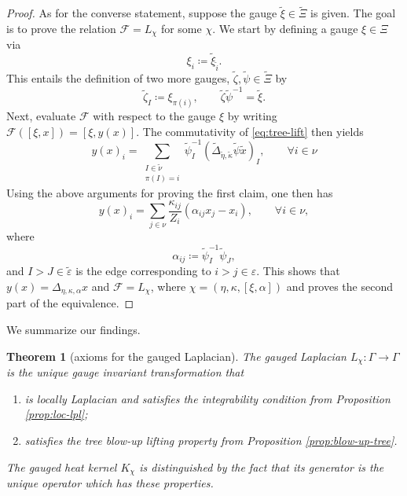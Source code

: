 \documentclass[10pt,reqno]{amsart}
\numberwithin{equation}{section}
\theoremstyle{bfnote}
\newtheorem{theorem}{Theorem}[section]
\theoremstyle{bfdef}
\newcommand{\mc}[1]{\mathcal{#1}}
\newcommand{\veps}{\varepsilon}
\begin{document}
\begin{proof}
		As for the converse statement, suppose the gauge $\tilde \xi \in \tilde \Xi$ is given. The goal is to prove the relation $\mc{F} = L_\chi$ for some $\chi$. We start by defining a gauge $\xi \in \Xi$ via
		\begin{equation}
			\xi_i \coloneqq \tilde\xi_{\tilde i}.
		\end{equation}
		This entails the definition of two more gauges, $\tilde \zeta, \tilde \psi \in \tilde \Xi$ by
		\begin{equation}
			\tilde \zeta_{I} \coloneqq \xi_{\pi(i)}, \qquad
			\tilde\zeta\tilde\psi^{-1} = \tilde \xi.
		\end{equation}
		Next, evaluate $\mc{F}$ with respect to the gauge $\xi$ by writing $\mc{F}([\xi,x]) = [\xi,y(x)]$. The commutativity of \eqref{eq:tree-lift} then yields
		\begin{equation}
			y(x)_i = 
			\sum_{\substack{I\in \tilde\nu \\ \pi(I) = i}} \tilde{\psi}^{-1}_{I} (\tilde{\Delta}_{\tilde\eta,\tilde\kappa} \tilde \psi \tilde x)_{I}, \qquad \forall i \in \nu
		\end{equation}
		Using the above arguments for proving the first claim, one then has
		\begin{equation}
			y(x)_i = 
			\sum_{j \in \nu} \frac{\kappa_{ij}}{Z_i}(\alpha_{ij}x_j - x_i), \qquad \forall i \in \nu,
		\end{equation} 
		where
		\begin{equation}
			\alpha_{ij} \coloneqq \tilde\psi_{I}^{-1} \tilde \psi_{J},
		\end{equation}
		and $I>J \in \tilde \veps$ is the edge corresponding to $i>j \in \veps$. This shows that $y(x) = \Delta_{\eta,\kappa,\alpha} x$ and $\mc{F} = L_\chi$, where $\chi = (\eta,\kappa,[\xi,\alpha])$ and proves the second part of the equivalence.
	\end{proof}

	We summarize our findings.
	\begin{theorem}[axioms for the gauged Laplacian]\label{thm:axioms}
		The gauged Laplacian $L_{\chi} : \Gamma \to \Gamma$ is the unique gauge invariant transformation that
		\begin{enumerate}
			\item is locally Laplacian and satisfies the integrability condition from Proposition \ref{prop:loc-lpl};
			\item satisfies the tree blow-up lifting property from Proposition \ref{prop:blow-up-tree}.
		\end{enumerate}
		The gauged heat kernel $K_{\chi}$ is distinguished by the fact that its generator is the unique operator which has these properties.
	\end{theorem}
\end{document}
